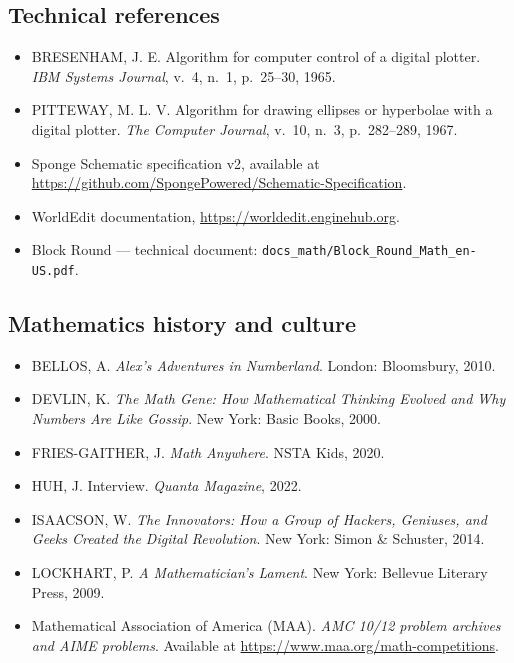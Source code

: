 \documentclass[12pt,a4paper]{scrartcl}
\begin{document}
\subsection{Technical references}
\begin{itemize}[leftmargin=1.3em,itemsep=0.15em,topsep=0.3em]
  \item BRESENHAM, J. E. Algorithm for computer control of a digital plotter. \emph{IBM Systems Journal}, v.~4, n.~1, p.~25--30, 1965.
  \item PITTEWAY, M. L. V. Algorithm for drawing ellipses or hyperbolae with a digital plotter. \emph{The Computer Journal}, v.~10, n.~3, p.~282--289, 1967.
  \item Sponge Schematic specification v2, available at \url{https://github.com/SpongePowered/Schematic-Specification}.
  \item WorldEdit documentation, \url{https://worldedit.enginehub.org}.
  \item Block Round --- technical document: \texttt{docs\_math/Block\_Round\_Math\_en-US.pdf}.
\end{itemize}

\subsection{Mathematics history and culture}
\begin{itemize}[leftmargin=1.3em,itemsep=0.15em,topsep=0.3em]
  \item BELLOS, A. \emph{Alex's Adventures in Numberland}. London: Bloomsbury, 2010.
  \item DEVLIN, K. \emph{The Math Gene: How Mathematical Thinking Evolved and Why Numbers Are Like Gossip}. New York: Basic Books, 2000.
  \item FRIES-GAITHER, J. \emph{Math Anywhere}. NSTA Kids, 2020.
  \item HUH, J. Interview. \emph{Quanta Magazine}, 2022.
  \item ISAACSON, W. \emph{The Innovators: How a Group of Hackers, Geniuses, and Geeks Created the Digital Revolution}. New York: Simon \& Schuster, 2014.
  \item LOCKHART, P. \emph{A Mathematician's Lament}. New York: Bellevue Literary Press, 2009.
  \item Mathematical Association of America (MAA). \emph{AMC 10/12 problem archives and AIME problems}. Available at \url{https://www.maa.org/math-competitions}.
\end{itemize}
\end{document}
